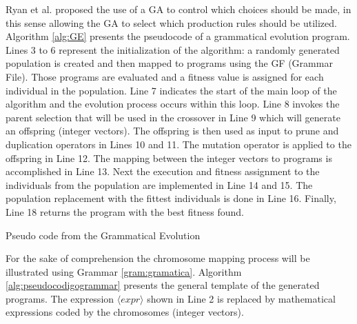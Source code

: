 \documentclass[conference]{IEEEtran}
\begin{document}
	Ryan et al. \cite{ryan1998grammatical}  proposed the use of a GA to control which choices should be made, in this sense allowing the GA to select which production rules should be utilized. Algorithm \ref{alg:GE} presents the pseudocode of a grammatical evolution program. Lines 3 to 6 represent the initialization of the algorithm: a randomly generated population is created and then mapped to programs using the GF (Grammar File). Those programs are evaluated and a fitness value is assigned for each individual in the population. Line 7 indicates the start of the main loop of the algorithm and the evolution process occurs within this loop. Line 8 invokes the parent selection that will be used in the crossover in Line 9 which will generate an offspring (integer vectors). The offspring is then used as input to prune and duplication operators in Lines 10 and 11. The mutation operator is applied to the offspring in Line 12. The mapping between the integer vectors to programs is accomplished in Line 13. Next the execution and fitness assignment to the individuals from the population are implemented in Line 14 and 15. The population replacement with the fittest individuals is done in Line 16. Finally, Line 18 returns the program with the best fitness found.
 
\begin{algorithm}[htb]
	\fontsize{8pt}{10pt}\selectfont
	\caption{Pseudo code from the Grammatical Evolution}
	\label{alg:GE}
\end{algorithm}


For the sake of comprehension the chromosome mapping process will be illustrated using Grammar \ref{gram:gramatica}. Algorithm \ref{alg:pseudocodigogrammar} presents the general template of the generated programs. The expression $\langle expr \rangle$ shown in Line 2 is replaced by mathematical expressions coded by the chromosomes (integer vectors). 
\end{document}
